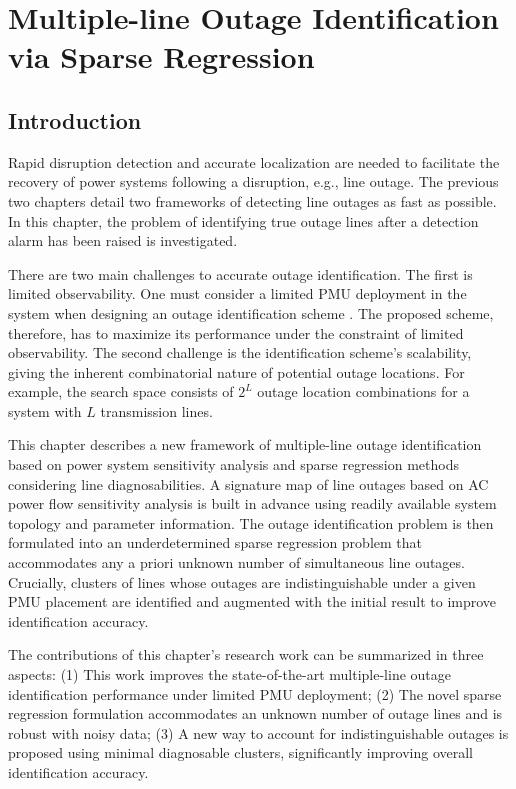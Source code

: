 
\chapter{Multiple-line Outage Identification via Sparse Regression}
\label{ch:identification}
\vspace{2em}

\section{Introduction} %
\label{ch5:sec:introduction}

Rapid disruption detection and accurate localization are needed to facilitate the recovery of power systems following a disruption, e.g., line outage. The previous two chapters detail two frameworks of detecting line outages as fast as possible. In this chapter, the problem of identifying true outage lines after a detection alarm has been raised is investigated.

There are two main challenges to accurate outage identification. The first is limited observability. One must consider a limited PMU deployment in the system when designing an outage identification scheme \cite{aminifar2014synchrophasor}. The proposed scheme, therefore, has to maximize its performance under the constraint of limited observability. The second challenge is the identification scheme's scalability, giving the inherent combinatorial nature of potential outage locations. For example, the search space consists of $2^L$ outage location combinations for a system with $L$ transmission lines.

This chapter describes a new framework of multiple-line outage identification based on power system sensitivity analysis and sparse regression methods considering line diagnosabilities. A signature map of line outages based on AC power flow sensitivity analysis is built in advance using readily available system topology and parameter information. The outage identification problem is then formulated into an underdetermined sparse regression problem that accommodates any a priori unknown number of simultaneous line outages. Crucially, clusters of lines whose outages are indistinguishable under a given PMU placement are identified and augmented with the initial result to improve identification accuracy.

The contributions of this chapter's research work can be summarized in three aspects: (1) This work improves the state-of-the-art multiple-line outage identification performance under limited PMU deployment; (2) The novel sparse regression formulation accommodates an unknown number of outage lines and is robust with noisy data; (3) A new way to account for indistinguishable outages is proposed using minimal diagnosable clusters, significantly improving overall identification accuracy.


